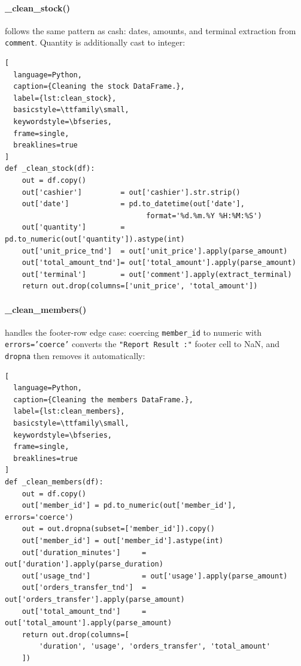 \paragraph{\_clean\_stock()} follows the same pattern as cash: dates, amounts, and
terminal extraction from \texttt{comment}. Quantity is additionally cast to integer:

\begin{lstlisting}[
  language=Python,
  caption={Cleaning the stock DataFrame.},
  label={lst:clean_stock},
  basicstyle=\ttfamily\small,
  keywordstyle=\bfseries,
  frame=single,
  breaklines=true
]
def _clean_stock(df):
    out = df.copy()
    out['cashier']         = out['cashier'].str.strip()
    out['date']            = pd.to_datetime(out['date'],
                                 format='%d.%m.%Y %H:%M:%S')
    out['quantity']        = pd.to_numeric(out['quantity']).astype(int)
    out['unit_price_tnd']  = out['unit_price'].apply(parse_amount)
    out['total_amount_tnd']= out['total_amount'].apply(parse_amount)
    out['terminal']        = out['comment'].apply(extract_terminal)
    return out.drop(columns=['unit_price', 'total_amount'])
\end{lstlisting}

\paragraph{\_clean\_members()} handles the footer-row edge case: coercing
\texttt{member\_id} to numeric with \texttt{errors='coerce'} converts the
\texttt{"Report Result\,:"} footer cell to NaN, and \texttt{dropna} then removes
it automatically:

\begin{lstlisting}[
  language=Python,
  caption={Cleaning the members DataFrame.},
  label={lst:clean_members},
  basicstyle=\ttfamily\small,
  keywordstyle=\bfseries,
  frame=single,
  breaklines=true
]
def _clean_members(df):
    out = df.copy()
    out['member_id'] = pd.to_numeric(out['member_id'], errors='coerce')
    out = out.dropna(subset=['member_id']).copy()
    out['member_id'] = out['member_id'].astype(int)
    out['duration_minutes']     = out['duration'].apply(parse_duration)
    out['usage_tnd']            = out['usage'].apply(parse_amount)
    out['orders_transfer_tnd']  = out['orders_transfer'].apply(parse_amount)
    out['total_amount_tnd']     = out['total_amount'].apply(parse_amount)
    return out.drop(columns=[
        'duration', 'usage', 'orders_transfer', 'total_amount'
    ])
\end{lstlisting}

